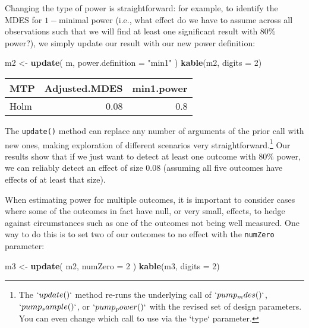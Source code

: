 \documentclass[
]{article}
\newenvironment{Shaded}{\begin{snugshade}}{\end{snugshade}}
\newcommand{\DataTypeTok}[1]{\textcolor[rgb]{0.13,0.29,0.53}{#1}}
\newcommand{\DecValTok}[1]{\textcolor[rgb]{0.00,0.00,0.81}{#1}}
\newcommand{\KeywordTok}[1]{\textcolor[rgb]{0.13,0.29,0.53}{\textbf{#1}}}
\newcommand{\NormalTok}[1]{#1}
\newcommand{\StringTok}[1]{\textcolor[rgb]{0.31,0.60,0.02}{#1}}
\begin{document}
Changing the type of power is straightforward: for example, to identify
the MDES for \(1-\)minimal power (i.e., what effect do we have to assume
across all observations such that we will find at least one significant
result with 80\% power?), we simply update our result with our new power
definition:

\begin{Shaded}
\begin{Highlighting}[]
\NormalTok{m2 \textless{}{-}}\StringTok{ }\KeywordTok{update}\NormalTok{( m, }\DataTypeTok{power.definition =} \StringTok{"min1"}\NormalTok{ )}
\KeywordTok{kable}\NormalTok{(m2, }\DataTypeTok{digits =} \DecValTok{2}\NormalTok{)}
\end{Highlighting}
\end{Shaded}

\begin{tabular}{l|r|r}
\hline
MTP & Adjusted.MDES & min1.power\\
\hline
Holm & 0.08 & 0.8\\
\hline
\end{tabular}

The \texttt{update()} method can replace any number of arguments of the
prior call with new ones, making exploration of different scenarios very
straightforward.\footnote{The $`update()`$ method re-runs the underlying call of $`pump_mdes()`$, $`pump_sample()`$, or $`pump_power()`$ with the revised set of design parameters. You can even change which call to use via the `type` parameter.}
Our results show that if we just want to detect at least one outcome
with 80\% power, we can reliably detect an effect of size \(0.08\)
(assuming all five outcomes have effects of at least that size).

When estimating power for multiple outcomes, it is important to consider
cases where some of the outcomes in fact have null, or very small,
effects, to hedge against circumstances such as one of the outcomes not
being well measured. One way to do this is to set two of our outcomes to
no effect with the \texttt{numZero} parameter:

\begin{Shaded}
\begin{Highlighting}[]
\NormalTok{m3 \textless{}{-}}\StringTok{ }\KeywordTok{update}\NormalTok{( m2, }\DataTypeTok{numZero =} \DecValTok{2}\NormalTok{ )}
\KeywordTok{kable}\NormalTok{(m3, }\DataTypeTok{digits =} \DecValTok{2}\NormalTok{)}
\end{Highlighting}
\end{Shaded}
\end{document}
